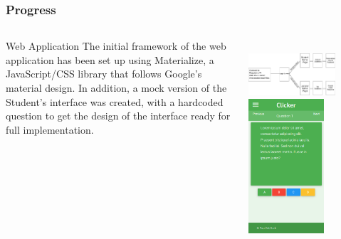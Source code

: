 \documentclass{beamer}
\begin{document}
\begin{frame}
\frametitle{Progress}
\begin{columns}[c] %

\begin{block}{Web Application}
The initial framework of the web application has been set up using Materialize, a JavaScript/CSS library that follows Google's material design. In addition, a mock version of the Student's interface was created, with a hardcoded question to get the design of the interface ready for full implementation.\\
\end{block}
\medskip
    \tiny{}\\
    \includegraphics[width=0.75\textwidth]{userflow.png}\\
    \includegraphics[height=5cm]{studentinterface.png}\\
    \tiny{}
\end{columns}
\end{frame}
\end{document}
